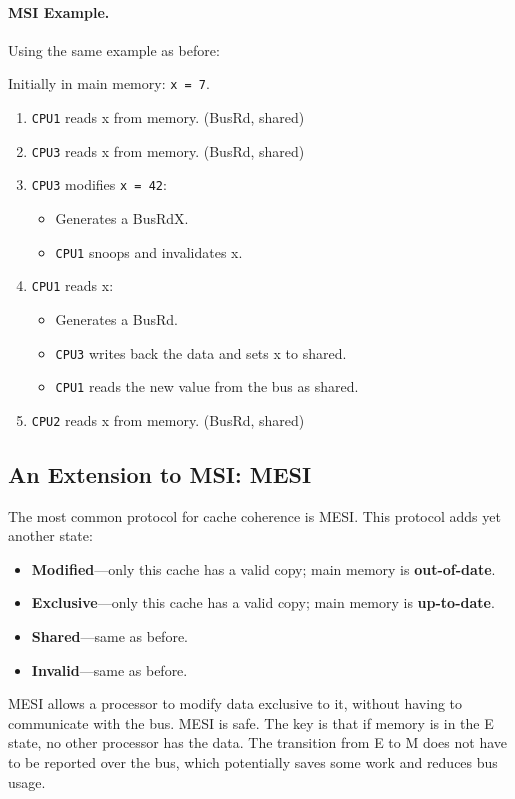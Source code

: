 \documentclass[a4paper]{report}
\begin{document}
\paragraph{MSI Example.} Using the same example as before:

Initially in main memory: {\tt x = 7}.

  \begin{enumerate}
    \item {\tt CPU1} reads x from memory. {(BusRd, shared)}
    \item {\tt CPU3} reads x from memory. {(BusRd, shared)}
    \item {\tt CPU3} modifies {\tt x = 42}:
      \begin{itemize}
        \item {Generates a BusRdX.}
        \item {{\tt CPU1} snoops and invalidates x.}
      \end{itemize}
    \item {\tt CPU1} reads x:
      \begin{itemize}
        \item {Generates a BusRd.}
        \item {{\tt CPU3} writes back the data and sets x to shared.}
        \item {{\tt CPU1} reads the new value from the bus as shared.}
      \end{itemize}
    \item {\tt CPU2} reads x from memory. {(BusRd, shared)}
  \end{enumerate}

\subsection*{An Extension to MSI: MESI}
    The most common protocol for cache coherence is MESI.
    This protocol adds yet another state:
      \begin{itemize}
        \item {\bf Modified}---only this cache has a valid copy; 
 main memory is {\bf out-of-date}.
        \item {\bf Exclusive}---only this cache has a valid copy; 
 main memory is {\bf up-to-date}.
        \item {\bf Shared}---same as before.
        \item {\bf Invalid}---same as before.
      \end{itemize}

    MESI allows a processor to modify data exclusive to it, without
    having to communicate with the bus.  MESI is safe. The key is that
    if memory is in the E state, no other processor has the data. The transition from E to M does not have to be reported over the bus, which potentially saves some work and reduces bus usage. 
\end{document}
